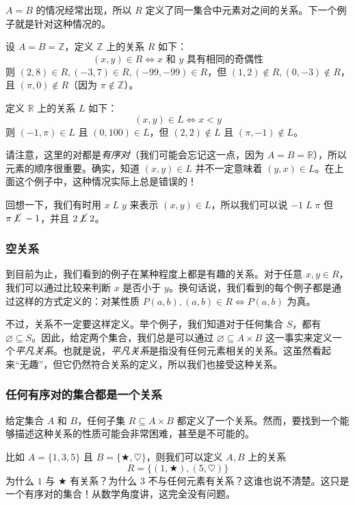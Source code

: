 $A = B$ 的情况经常出现，所以 $R$ 定义了同一集合中元素对之间的关系。下一个例子就是针对这种情况的。\\

\begin{example}
    设 $A=B=\mathbb{Z}$，定义 $\mathbb{Z}$ 上的关系 $R$ 如下：
    \[(x, y) \in R \iff x \text{ 和 } y \text{ 具有相同的奇偶性}\]
    则 $(2,8) \in R, (-3, 7) \in R, (-99, -99) \in R$，但 $(1,2) \notin R, (0, -3) \notin R$，且 $(\pi, 0) \notin R$（因为 $\pi \notin \mathbb{Z}$）。
\end{example}

\begin{example}
    定义 $\mathbb{R}$ 上的关系 $L$ 如下：
    \[(x, y) \in L \iff x < y\]
    则 $(-1, \pi) \in L$ 且 $(0, 100) \in L$，但 $(2, 2) \notin L$ 且 $(\pi, -1) \notin L$。
\end{example}

请注意，这里的对都是\emph{有序对}（我们可能会忘记这一点，因为 $A = B = \mathbb{R}$），所以元素的顺序很重要。确实，知道 $(x, y) \in L$ 并不一定意味着 $(y, x) \in L$。在上面这个例子中，这种情况实际上总是错误的！

回想一下，我们有时用 $x \;L\; y$ 来表示 $(x, y) \in L$，所以我们可以说 $-1 \;L\; \pi$ 但 $\pi \;\cancel{L}\; -1$，并且 $2 \;\cancel{L}\; 2$。

\subsubsection*{空关系}

\begin{remark}
    到目前为止，我们看到的例子在某种程度上都是有趣的关系。对于任意 $x,y \in R$，我们可以通过比较来判断 $x$ 是否小于 $y$。换句话说，我们看到的每个例子都是通过这样的方式定义的：对某性质 $P(a, b), (a, b) \in R \iff P(a, b)$ 为真。
\end{remark}

不过，关系不一定要这样定义。举个例子，我们知道对于任何集合 $S$，都有 $\varnothing \subseteq S$。因此，给定两个集合，我们总是可以通过 $\varnothing \subseteq A \times B$ 这一事实来定义一个\emph{平凡关系}。也就是说，\emph{平凡关系}是指没有任何元素相关的关系。这虽然看起来``无趣''，但它仍然符合关系的定义，所以我们也接受这种关系。

\subsubsection*{任何有序对的集合都是一个关系}

\begin{remark}
    给定集合 $A$ 和 $B$，任何子集 $R \subseteq A \times B$ 都定义了一个关系。然而，要找到一个能够描述这种关系的性质可能会非常困难，甚至是不可能的。

    比如 $A=\{1,3,5\}$ 且 $B=\{\bigstar, \heartsuit\}$，则我们可以定义 $A, B$ 上的关系
    \[R=\{(1,\bigstar), (5, \heartsuit)\}\]
    为什么 $1$ 与 $\bigstar$ 有关系？为什么 $3$ 不与任何元素有关系？这谁也说不清楚。这只是一个有序对的集合！从数学角度讲，这完全没有问题。
\end{remark}

